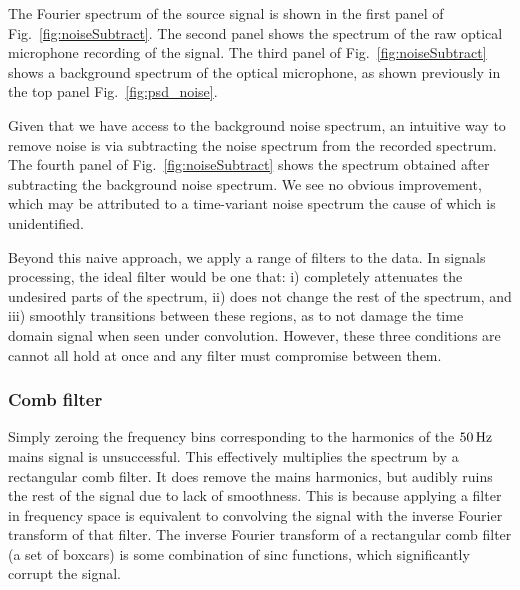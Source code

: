 \documentclass[paper-main.tex]{subfiles}
\begin{document}
The Fourier spectrum of the source signal is shown in the first panel of Fig.~\ref{fig:noiseSubtract}. The second panel shows the spectrum of the raw optical microphone recording of the signal. The third panel of Fig.~\ref{fig:noiseSubtract} shows a background spectrum of the optical microphone, as shown previously in the top panel Fig.~\ref{fig:psd_noise}.

Given that we have access to the background noise spectrum, an intuitive way to remove noise is via subtracting the noise spectrum from the recorded spectrum. The fourth panel of Fig.~\ref{fig:noiseSubtract} shows the spectrum obtained after subtracting the background noise spectrum. We see no obvious improvement, which may be attributed to a time-variant noise spectrum the cause of which is unidentified. %


Beyond this naive approach, we apply a range of filters to the data.
In signals processing, the ideal filter would be one that:
i) completely attenuates the undesired parts of the spectrum, 
ii) does not change the rest of the spectrum, and 
iii) smoothly transitions between these regions, as to not damage the time domain signal when seen under convolution. 
However, these three conditions are cannot all hold at once and any filter must compromise between them. 



\subsubsection{Comb filter}

Simply zeroing the frequency bins corresponding to the harmonics of the $50\,{\rm Hz}$ mains signal is unsuccessful. This effectively multiplies the spectrum by a rectangular comb filter. It does remove the mains harmonics, but audibly ruins the rest of the signal due to lack of smoothness. This is because applying a filter in frequency space is equivalent to convolving the signal with the inverse Fourier transform of that filter. The inverse Fourier transform of a rectangular comb filter (a set of boxcars) is some combination of sinc functions, which significantly corrupt the signal. 

\end{document}
